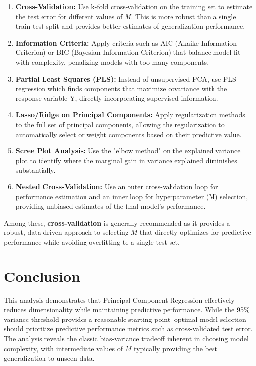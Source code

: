 \documentclass[11pt]{article}
\begin{document}
\begin{enumerate}
    \item \textbf{Cross-Validation:} Use k-fold cross-validation on the training set to estimate the test error for different values of $M$. This is more robust than a single train-test split and provides better estimates of generalization performance.
    
    \item \textbf{Information Criteria:} Apply criteria such as AIC (Akaike Information Criterion) or BIC (Bayesian Information Criterion) that balance model fit with complexity, penalizing models with too many components.
    
    \item \textbf{Partial Least Squares (PLS):} Instead of unsupervised PCA, use PLS regression which finds components that maximize covariance with the response variable Y, directly incorporating supervised information.
    
    \item \textbf{Lasso/Ridge on Principal Components:} Apply regularization methods to the full set of principal components, allowing the regularization to automatically select or weight components based on their predictive value.
    
    \item \textbf{Scree Plot Analysis:} Use the "elbow method" on the explained variance plot to identify where the marginal gain in variance explained diminishes substantially.
    
    \item \textbf{Nested Cross-Validation:} Use an outer cross-validation loop for performance estimation and an inner loop for hyperparameter (M) selection, providing unbiased estimates of the final model's performance.
\end{enumerate}

Among these, \textbf{cross-validation} is generally recommended as it provides a robust, data-driven approach to selecting $M$ that directly optimizes for predictive performance while avoiding overfitting to a single test set.

\section{Conclusion}
This analysis demonstrates that Principal Component Regression effectively reduces dimensionality while maintaining predictive performance. While the 95\% variance threshold provides a reasonable starting point, optimal model selection should prioritize predictive performance metrics such as cross-validated test error. The analysis reveals the classic bias-variance tradeoff inherent in choosing model complexity, with intermediate values of $M$ typically providing the best generalization to unseen data.
\end{document}
